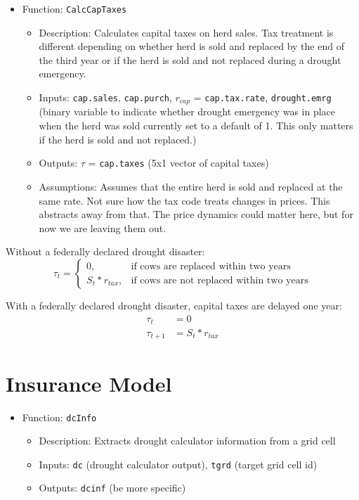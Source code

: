 \documentclass[11pt]{article}
\begin{document}
\begin{itemize}
\item Function: \verb!CalcCapTaxes!
	\begin{itemize}
	\item Description: Calculates capital taxes on herd sales. Tax treatment is different depending on whether herd is sold and replaced by the end of the third year or if the herd is sold and not replaced during a drought emergency.
	\item Inputs: \verb!cap.sales!, \verb!cap.purch!, $r_{cap}$ = \verb!cap.tax.rate!, \verb!drought.emrg! (binary variable to indicate whether drought emergency was in place when the herd was sold currently set to a default of 1. This only matters if the herd is sold and not replaced.)
	\item Outputs: $\tau$ = \verb!cap.taxes! (5x1 vector of capital taxes)
	\item Assumptions: Assumes that the entire herd is sold and replaced at the same rate. Not sure how the tax code treats changes in prices. This abstracts away from that. The price dynamics could matter here, but for now we are leaving them out.
	\end{itemize}
\end{itemize}

Without a federally declared drought disaster:
\begin{equation}
\tau_t = 
\begin{cases}
0, & \text{if cows are replaced within two years}  \\
S_t * r_{tax}, & \text{if cows are not replaced within two years}
\end{cases}
\end{equation}

With a federally declared drought disaster, capital taxes are delayed one year:
\begin{align}
\tau_t &= 0 \\
\tau_{t+1} &= S_t * r_{tax}
\end{align}



\section{Insurance Model}

\begin{itemize}	
\item Function: \verb!dcInfo! 
	\begin{itemize}
	\item Description: Extracts drought calculator information from a grid cell
	\item Inputs: \verb!dc! (drought calculator output), \verb!tgrd! (target grid cell id)
	\item Outputs: \verb!dcinf! (be more specific)
	\end{itemize}
\end{itemize}
\end{document}
